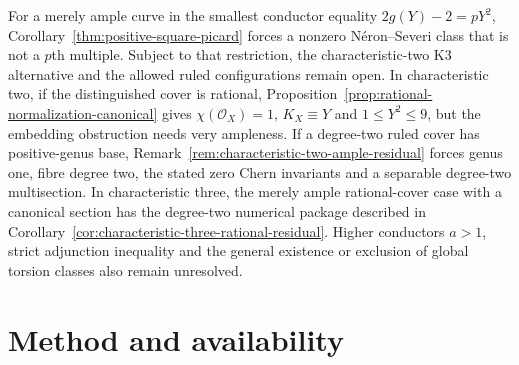 \documentclass[11pt]{article}
\theoremstyle{remark}\newtheorem{remark}[theorem]{Remark}
\newcommand{\OO}{\mathcal O}
\begin{document}
For a merely ample curve in the smallest conductor equality $2g(Y)-2=pY^2$, Corollary~\ref{thm:positive-square-picard} forces a nonzero N\'eron--Severi class that is not a $p$th multiple. Subject to that restriction, the characteristic-two K3 alternative and the allowed ruled configurations remain open. In characteristic two, if the distinguished cover is rational, Proposition~\ref{prop:rational-normalization-canonical} gives $\chi(\OO_X)=1$, $K_X\equiv Y$ and $1\leq Y^2\leq9$, but the embedding obstruction needs very ampleness. If a degree-two ruled cover has positive-genus base, Remark~\ref{rem:characteristic-two-ample-residual} forces genus one, fibre degree two, the stated zero Chern invariants and a separable degree-two multisection. In characteristic three, the merely ample rational-cover case with a canonical section has the degree-two numerical package described in Corollary~\ref{cor:characteristic-three-rational-residual}. Higher conductors $a>1$, strict adjunction inequality and the general existence or exclusion of global torsion classes also remain unresolved.

\section*{Method and availability}
\end{document}

